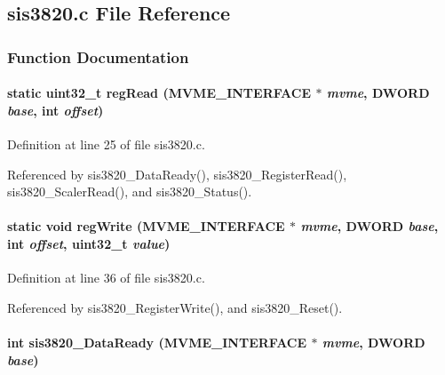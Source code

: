 \subsection{sis3820.c File Reference}
\label{sis3820_8c}


\subsubsection{Function Documentation}
\paragraph[{regRead}]{\setlength{\rightskip}{0pt plus 5cm}static uint32\_\-t regRead ({\bf MVME\_\-INTERFACE} $\ast$ {\em mvme}, \/  {\bf DWORD} {\em base}, \/  int {\em offset})}\hfill\label{sis3820_8c_ae725ca307cd6f4fdfdd5476249d31e59}


Definition at line 25 of file sis3820.c.

Referenced by sis3820\_\-DataReady(), sis3820\_\-RegisterRead(), sis3820\_\-ScalerRead(), and sis3820\_\-Status().
\paragraph[{regWrite}]{\setlength{\rightskip}{0pt plus 5cm}static void regWrite ({\bf MVME\_\-INTERFACE} $\ast$ {\em mvme}, \/  {\bf DWORD} {\em base}, \/  int {\em offset}, \/  uint32\_\-t {\em value})}\hfill\label{sis3820_8c_a339b5d8afd6890a2c3c6c659701170e3}


Definition at line 36 of file sis3820.c.

Referenced by sis3820\_\-RegisterWrite(), and sis3820\_\-Reset().
\paragraph[{sis3820\_\-DataReady}]{\setlength{\rightskip}{0pt plus 5cm}int sis3820\_\-DataReady ({\bf MVME\_\-INTERFACE} $\ast$ {\em mvme}, \/  {\bf DWORD} {\em base})}\hfill\label{sis3820_8c_ade83db7a833268f5f3942062cb5c8fe0}


